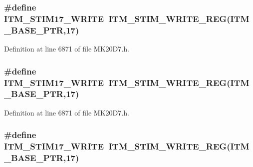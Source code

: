 \subsubsection[{\texorpdfstring{I\+T\+M\+\_\+\+S\+T\+I\+M17\+\_\+\+W\+R\+I\+TE}{ITM_STIM17_WRITE}}]{\setlength{\rightskip}{0pt plus 5cm}\#define I\+T\+M\+\_\+\+S\+T\+I\+M17\+\_\+\+W\+R\+I\+TE~{\bf I\+T\+M\+\_\+\+S\+T\+I\+M\+\_\+\+W\+R\+I\+T\+E\+\_\+\+R\+EG}({\bf I\+T\+M\+\_\+\+B\+A\+S\+E\+\_\+\+P\+TR},17)}\hypertarget{group___i_t_m___register___accessor___macros_gab955a13756ae2b569880dbef823a29a4}{}\label{group___i_t_m___register___accessor___macros_gab955a13756ae2b569880dbef823a29a4}


Definition at line 6871 of file M\+K20\+D7.\+h.

\subsubsection[{\texorpdfstring{I\+T\+M\+\_\+\+S\+T\+I\+M17\+\_\+\+W\+R\+I\+TE}{ITM_STIM17_WRITE}}]{\setlength{\rightskip}{0pt plus 5cm}\#define I\+T\+M\+\_\+\+S\+T\+I\+M17\+\_\+\+W\+R\+I\+TE~{\bf I\+T\+M\+\_\+\+S\+T\+I\+M\+\_\+\+W\+R\+I\+T\+E\+\_\+\+R\+EG}({\bf I\+T\+M\+\_\+\+B\+A\+S\+E\+\_\+\+P\+TR},17)}\hypertarget{group___i_t_m___register___accessor___macros_gab955a13756ae2b569880dbef823a29a4}{}\label{group___i_t_m___register___accessor___macros_gab955a13756ae2b569880dbef823a29a4}


Definition at line 6871 of file M\+K20\+D7.\+h.

\subsubsection[{\texorpdfstring{I\+T\+M\+\_\+\+S\+T\+I\+M17\+\_\+\+W\+R\+I\+TE}{ITM_STIM17_WRITE}}]{\setlength{\rightskip}{0pt plus 5cm}\#define I\+T\+M\+\_\+\+S\+T\+I\+M17\+\_\+\+W\+R\+I\+TE~{\bf I\+T\+M\+\_\+\+S\+T\+I\+M\+\_\+\+W\+R\+I\+T\+E\+\_\+\+R\+EG}({\bf I\+T\+M\+\_\+\+B\+A\+S\+E\+\_\+\+P\+TR},17)}\hypertarget{group___i_t_m___register___accessor___macros_gab955a13756ae2b569880dbef823a29a4}{}\label{group___i_t_m___register___accessor___macros_gab955a13756ae2b569880dbef823a29a4}



